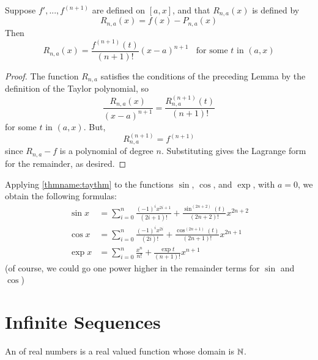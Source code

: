 \documentclass[12pt, a4paper, oneside, openright, titlepage]{book}
\begin{document}
\begin{namthm}\label{thmname:taythm}
    Suppose $f',...,f^{(n+1)}$ are defined on $[a,x]$, and that $R_{n,a}(x)$ is defined by \begin{equation*}
        R_{n,a}(x) = f(x) - P_{n,a}(x)
    \end{equation*}
    Then \begin{equation*}
        R_{n,a}(x) = \frac{f^{(n+1)}(t)}{(n+1)!}(x-a)^{n+1}\;\;\text{ for some $t$ in } (a,x)
    \end{equation*}
\end{namthm}
\begin{proof}
    The function $R_{n,a}$ satisfies the conditions of the preceding Lemma by the definition of the Taylor polynomial, so \begin{equation*}
        \frac{R_{n,a}(x)}{(x-a)^{n+1}} = \frac{R_{n,a}^{(n+1)}(t)}{(n+1)!}
    \end{equation*}
    for some $t$ in $(a,x)$. But, \begin{equation*}
        R_{n,a}^{(n+1)} = f^{(n+1)}
    \end{equation*}
    since $R_{n,a} - f$ is a polynomial of degree $n$. Substituting gives the Lagrange form for the remainder, as desired.
\end{proof}

\begin{eg}
    Applying \ref{thmname:taythm} to the functions $\sin$, $\cos$, and $\exp$, with $a = 0$, we obtain the following formulas: \begin{align*}
        \sin x &= \sum\limits_{i=0}^n\frac{(-1)^ix^{2i+1}}{(2i+1)!} + \frac{\sin^{(2n+2)}(t)}{(2n+2)!}x^{2n+2} \\
        \cos x &= \sum\limits_{i=0}^n\frac{(-1)^ix^{2i}}{(2i)!} + \frac{\cos^{(2n+1)}(t)}{(2n+1)!}x^{2n+1} \\
        \exp x &= \sum\limits_{i=0}^n\frac{x^n}{n!} + \frac{\exp t}{(n+1)!}x^{n+1}
    \end{align*}
    (of course, we could go one power higher in the remainder terms for $\sin$ and $\cos$)
\end{eg}


\section{Infinite Sequences}

\begin{defn}
    An  of real numbers is a real valued function whose domain is $\mathbb N$.
\end{defn}
\end{document}
